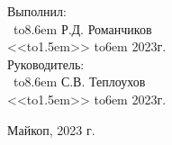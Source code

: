 \documentclass[a4paper, 12pt]{article}
\begin{document}
\begin{flushleft}
\par\bigskip
\par\bigskip
\par\bigskip\par\bigskip
\par\bigskip
\par\bigskip
\par\bigskip\par\bigskip
\par\bigskip
\par\bigskip
\par\bigskip\par\bigskip
\par\bigskip
\par\bigskip
\par\bigskip\par\bigskip
\par\bigskip
\par\bigskip
\par\bigskip
\par\bigskip
\par\bigskip
\par\bigskip
\par\bigskip
\hspace{9cm}Выполнил: \\
\def\hrf#1{\hbox to#1{\hrulefill}}\
\hspace{9cm}\hrf{8.6em} Р.Д. Романчиков \\
\hspace{9cm}<<\hrf{1.5em}>> \hrf{6em} 2023г.\\

\hspace{9cm}Руководитель: \\
\def\hrf#1{\hbox to#1{\hrulefill}}\
\hspace{9cm}\hrf{8.6em} С.В. Теплоухов  \\
\hspace{9cm}<<\hrf{1.5em}>> \hrf{6em} 2023г.
\end{flushleft}
\begin{center}
\par\bigskip\par\bigskip\par\bigskip\par\bigskip\par\bigskip
\par\bigskip

\par\bigskip\par\bigskip


   {\small Майкоп, 2023 г.}  
\end{center}
\newpage
\end{document}

